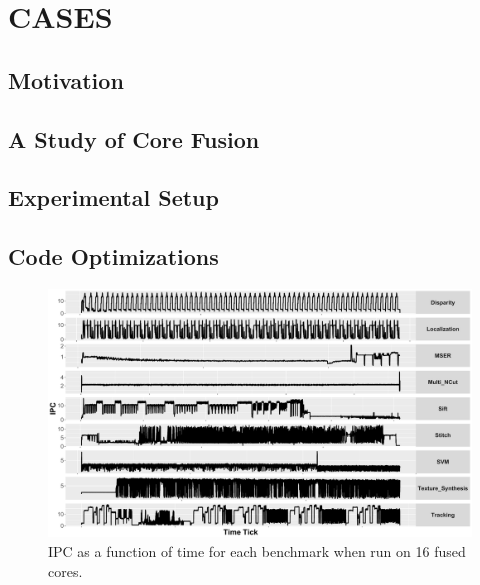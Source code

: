 \newcommand{\bm}[1]{\textit{#1}}
\setlength{\textfloatsep}{0.1cm}

\chapter{CASES}




%

\section{Motivation}\label{sec:motivation}


\section{A Study of Core Fusion}\label{sec:lim_study}


\section{Experimental Setup}\label{sec:setup}


\section{Code Optimizations}\label{sec:opt}


\begin{figure}
    \centering
    \includegraphics[width=1\textwidth]{cases-paper/graphics/Exploration/ipcs_16_2.pdf}
    \caption{IPC as a function of time for each benchmark when run on 16 fused cores.}
    \label{fig:sxt}
\end{figure}


